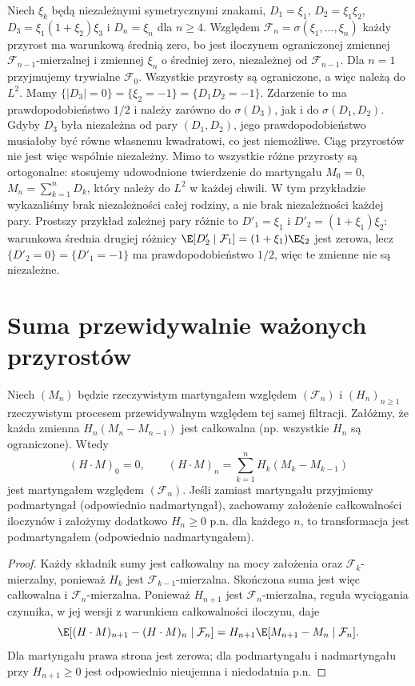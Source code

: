 \begin{przyklad}
Niech $\xi_k$ będą niezależnymi symetrycznymi
znakami, $D_1=\xi_1$, $D_2=\xi_1\xi_2$,
$D_3=\xi_1(1+\xi_2)\xi_3$ i
$D_n=\xi_n$ dla $n\geq4$.
Względem $\mathcal F_n=\sigma(\xi_1,\ldots,\xi_n)$
każdy przyrost ma warunkową średnią zero,
bo jest iloczynem ograniczonej zmiennej
$\mathcal F_{n-1}$-mierzalnej i zmiennej $\xi_n$
o średniej zero, niezależnej od $\mathcal F_{n-1}$.
Dla $n=1$ przyjmujemy trywialne $\mathcal F_0$.
Wszystkie przyrosty są ograniczone, a więc
należą do $L^2$. Mamy
$\{|D_3|=0\}=\{\xi_2=-1\}=\{D_1D_2=-1\}$.
Zdarzenie to ma prawdopodobieństwo $1/2$ i należy
zarówno do $\sigma(D_3)$, jak i do $\sigma(D_1,D_2)$.
Gdyby $D_3$ była niezależna od pary $(D_1,D_2)$,
jego prawdopodobieństwo musiałoby być równe
własnemu kwadratowi, co jest niemożliwe.
Ciąg przyrostów nie jest więc wspólnie niezależny.
Mimo to wszystkie różne przyrosty są ortogonalne:
stosujemy udowodnione twierdzenie do martyngału
$M_0=0$, $M_n=\sum_{k=1}^nD_k$, który należy
do $L^2$ w każdej chwili.
W tym przykładzie wykazaliśmy brak niezależności
całej rodziny, a nie brak niezależności każdej pary.
Prostszy przykład zależnej pary różnic to
$D'_1=\xi_1$ i $D'_2=(1+\xi_1)\xi_2$:
warunkowa średnia drugiej różnicy
$\E[D'_2\mid\mathcal F_1]=(1+\xi_1)\E\xi_2$
jest zerowa, lecz $\{D'_2=0\}=\{D'_1=-1\}$ ma prawdopodobieństwo
$1/2$, więc te zmienne nie są niezależne.
\end{przyklad}

\section{Suma przewidywalnie ważonych przyrostów}

\begin{twierdzenie}
Niech $(M_n)$ będzie rzeczywistym martyngałem
względem $(\mathcal F_n)$ i $(H_n)_{n\geq1}$
rzeczywistym procesem przewidywalnym względem
tej samej filtracji.
Załóżmy, że każda zmienna
$H_n(M_n-M_{n-1})$ jest całkowalna
(np. wszystkie $H_n$ są ograniczone).
Wtedy
\[
(H\cdot M)_0=0,\qquad
(H\cdot M)_n=\sum_{k=1}^nH_k(M_k-M_{k-1})
\]
jest martyngałem względem $(\mathcal F_n)$.
Jeśli zamiast martyngału przyjmiemy podmartyngał
(odpowiednio nadmartyngał), zachowamy założenie
całkowalności iloczynów i założymy dodatkowo
$H_n\geq0$ p.n. dla każdego $n$, to transformacja
jest podmartyngałem (odpowiednio nadmartyngałem).
\end{twierdzenie}
\begin{proof}
Każdy składnik sumy jest całkowalny na mocy
założenia oraz $\mathcal F_k$-mierzalny, ponieważ
$H_k$ jest $\mathcal F_{k-1}$-mierzalna.
Skończona suma jest więc całkowalna
i $\mathcal F_n$-mierzalna.
Ponieważ $H_{n+1}$ jest $\mathcal F_n$-mierzalna,
reguła wyciągania czynnika, w jej wersji
z warunkiem całkowalności iloczynu, daje
\[
\E[(H\cdot M)_{n+1}-(H\cdot M)_n
\mid\mathcal F_n]
=H_{n+1}\E[M_{n+1}-M_n\mid\mathcal F_n].
\]
Dla martyngału prawa strona jest zerowa;
dla podmartyngału i nadmartyngału przy
$H_{n+1}\geq0$ jest odpowiednio nieujemna
i niedodatnia p.n.
\end{proof}

